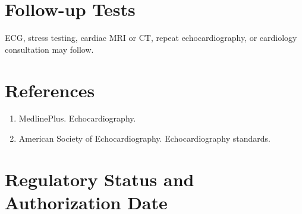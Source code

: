 \section*{Follow-up Tests} ECG, stress testing, cardiac MRI or CT, repeat echocardiography, or cardiology consultation may follow.
\section*{References} \begin{enumerate}\item MedlinePlus. Echocardiography.\item American Society of Echocardiography. Echocardiography standards.\end{enumerate}
\clearpage\section*{Regulatory Status and Authorization Date}\clearpage

